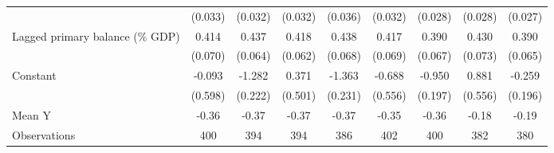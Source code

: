 {\begin{tabular}{l*{8}{c}}
                    &     (0.033)         &     (0.032)         &     (0.032)         &     (0.036)         &     (0.032)         &     (0.028)         &     (0.028)         &     (0.027)         \\
\addlinespace
Lagged primary balance (\% GDP)&       0.414\sym{***}&       0.437\sym{***}&       0.418\sym{***}&       0.438\sym{***}&       0.417\sym{***}&       0.390\sym{***}&       0.430\sym{***}&       0.390\sym{***}\\
                    &     (0.070)         &     (0.064)         &     (0.062)         &     (0.068)         &     (0.069)         &     (0.067)         &     (0.073)         &     (0.065)         \\
\addlinespace
Constant            &      -0.093         &      -1.282\sym{***}&       0.371         &      -1.363\sym{***}&      -0.688         &      -0.950\sym{***}&       0.881         &      -0.259         \\
                    &     (0.598)         &     (0.222)         &     (0.501)         &     (0.231)         &     (0.556)         &     (0.197)         &     (0.556)         &     (0.196)         \\
\midrule
Mean Y              &       -0.36         &       -0.37         &       -0.37         &       -0.37         &       -0.35         &       -0.36         &       -0.18         &       -0.19         \\
Observations        &         400         &         394         &         394         &         386         &         402         &         400         &         382         &         380         \\
\bottomrule
\end{tabular}
}
